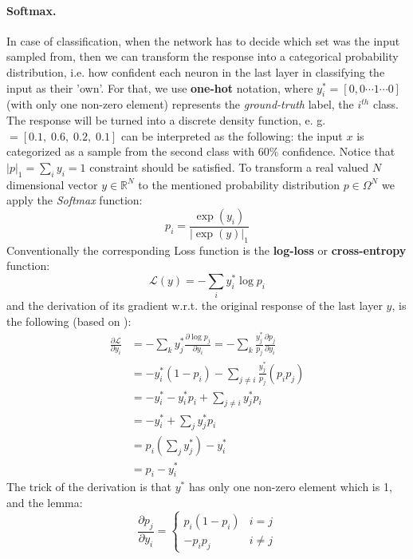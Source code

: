 \paragraph{Softmax.} In case of classification, 
when the network has to decide which set was the input sampled from, 
then we can transform the response into a categorical probability distribution, 
i.e. how confident each neuron in the last layer in classifying the input as their 'own'.
For that, we use \textbf{one-hot} notation, where $y^*_i = \left[ 0,0 \cdots 1 \cdots 0\right]$ (with only one non-zero element) represents the \emph{ground-truth} label, the $i^{th}$ class.
The response will be turned into a discrete density function, e. g. $  = [0.1, \; 0.6, \; 0.2, \; 0.1]$ can be interpreted as the following:
the input $x$ is categorized as a sample from the second class with 60\% confidence. Notice that $|p|_1=\sum_i y_i=1$ constraint should be satisfied.
To transform a real valued $N$ dimensional vector $y \in \mathbb{R}^N$ to the mentioned probability distribution $p\in \Omega^N$ we apply the \emph{Softmax} function:
\begin{equation}
p_i = \frac{\exp(y_i)}{|\exp(y)|_1}
\end{equation}
Conventionally the corresponding Loss function is the \textbf{log-loss} or \textbf{cross-entropy} function:
\begin{equation}
\mathcal{L}(y)=-\sum_i y^*_i \log p_i
\end{equation}
and the derivation of its gradient w.r.t. the original response of the last layer $y$, is the following (based on \cite{softmax}):
\begin{equation}\label{eq:softmax}
\begin{split}
\frac{\partial \mathcal{L}}{\partial y_i} &=
-\sum_k y^*_j \frac{\partial \log p_j}{\partial y_i} = 
-\sum_k \frac{y^*_j}{p_j}\frac{\partial p_j}{\partial y_i} \\
&= -y^*_i\left(1-p_i\right) - \sum_{j \neq i} \frac{y^*_j}{p_j}\left(p_i p_j\right) \\
&= -y^*_i-y^*_i p_i + \sum_{j \neq i} y^*_j p_i \\
&= -y^*_i + \sum_j y^*_j p_i \\
&= p_i \left(\sum_j y^*_j\right) -y^*_i \\
&= p_i - y^*_i
\end{split}
\end{equation}
The trick of the derivation is that $y^*$ has only one non-zero element which is 1, and the lemma:
$$
\frac{\partial p_j}{\partial y_i} = 
\begin{cases}
    p_i(1-p_i) & i=j \\
    -p_i p_j & i \neq j
\end{cases}
$$
